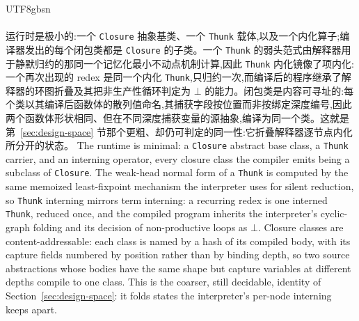 \begin{CJK*}{UTF8}{gbsn}
  \paragraph{}
  \ifTablambdaChinese
  运行时是极小的:一个 \texttt{Closure} 抽象基类、一个 \texttt{Thunk} 载体,以及一个内化算子;编译器发出的每个闭包类都是 \texttt{Closure} 的子类。一个 \texttt{Thunk} 的弱头范式由解释器用于静默归约的那同一个记忆化最小不动点机制计算,因此 \texttt{Thunk} 内化镜像了项内化:一个再次出现的 redex 是同一个内化 \texttt{Thunk},只归约一次,而编译后的程序继承了解释器的环图折叠及其把非生产性循环判定为 $\bot$ 的能力。闭包类是内容可寻址的:每个类以其编译后函数体的散列值命名,其捕获字段按位置而非按绑定深度编号,因此两个函数体形状相同、但在不同深度捕获变量的源抽象,编译为同一个类。这就是第~\ref{sec:design-space} 节那个更粗、却仍可判定的同一性:它折叠解释器逐节点内化所分开的状态。
  \else
  The runtime is minimal: a \texttt{Closure} abstract base class, a \texttt{Thunk} carrier, and an interning operator, every closure class the compiler emits being a subclass of \texttt{Closure}. The weak-head normal form of a \texttt{Thunk} is computed by the same memoized least-fixpoint mechanism the interpreter uses for silent reduction, so \texttt{Thunk} interning mirrors term interning: a recurring redex is one interned \texttt{Thunk}, reduced once, and the compiled program inherits the interpreter's cyclic-graph folding and its decision of non-productive loops as $\bot$. Closure classes are content-addressable: each class is named by a hash of its compiled body, with its capture fields numbered by position rather than by binding depth, so two source abstractions whose bodies have the same shape but capture variables at different depths compile to one class. This is the coarser, still decidable, identity of Section~\ref{sec:design-space}: it folds states the interpreter's per-node interning keeps apart.
  \fi


\end{CJK*}
